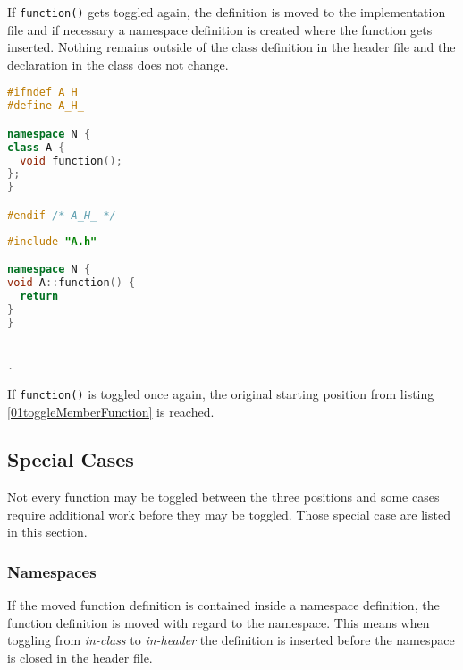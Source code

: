 If \texttt{function()} gets toggled again, the definition is moved to the
implementation file and if necessary a namespace definition is created where
the function gets inserted. Nothing remains outside of the class definition in the
header file and the declaration in the class does not change.

\vspace{0.5cm}
\begin{minipage}{.48\textwidth}
\lstset{xrightmargin=0.5cm}
\begin{lstlisting}[caption={A.h, after moved definition},
label={03toggleMemberFunction}, language=C++]
#ifndef A_H_
#define A_H_

namespace N {
class A {
  void function();
};
}

#endif /* A_H_ */
\end{lstlisting}
\end{minipage}%
\begin{minipage}{.48\textwidth}
\lstset{xleftmargin=0.5cm}
\begin{lstlisting}[caption={A.cpp with definition},
label={03_1toggleMemberFunction}, language=C++ ]
#include "A.h"

namespace N {
void A::function() {
  return
}
}


.
\end{lstlisting}
\end{minipage}

If \texttt{function()} is toggled once again, the original starting
position from listing \ref{01toggleMemberFunction} is reached.

\subsection{Special Cases}

Not every function may be toggled between the three positions and some cases 
require additional work before they may be toggled. Those special case are 
listed in this section.

\subsubsection{Namespaces}

If the moved function definition is contained inside a namespace definition,
the function definition is moved with regard to the namespace. This means when
toggling from \textit{in-class} to \textit{in-header} the definition is
inserted before the namespace is closed in the header file.

